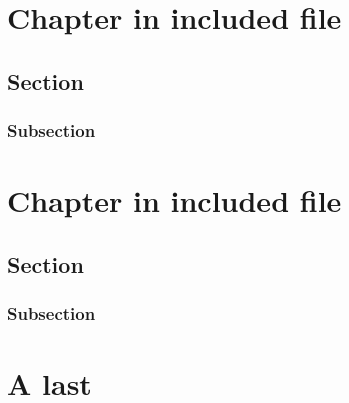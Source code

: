 \documentclass{book}
\newcommand{\Texinfothechapterheading}{}
\newcommand{\Texinfoheadingchaptername}{\chaptername}
\newcommand{\Texinfotheinclude}{}%
\newcommand{\Texinfochapter}[1]{\chapter{#1}
\renewcommand{\Texinfothechapterheading}{\Texinfoheadingchaptername{} \thechapter{} }%
}%
\renewcommand{\_}{\Texinfounderscore\discretionary{}{}{}}
\begin{document}
\Texinfochapter{{Chapter in included file}}

\section{{Section}}

\subsection{{Subsection}}

\renewcommand{\Texinfotheinclude}{section\_file\_no\_node\_include.texi}%

\renewcommand{\Texinfotheinclude}{}%

\renewcommand{\Texinfotheinclude}{section\_file\_no\_node.texi}%


\Texinfochapter{{Chapter in included file}}

\section{{Section}}

\subsection{{Subsection}}

\renewcommand{\Texinfotheinclude}{}%


\Texinfochapter{{A last}}
\label{anchor:last-chap}%
\end{document}
